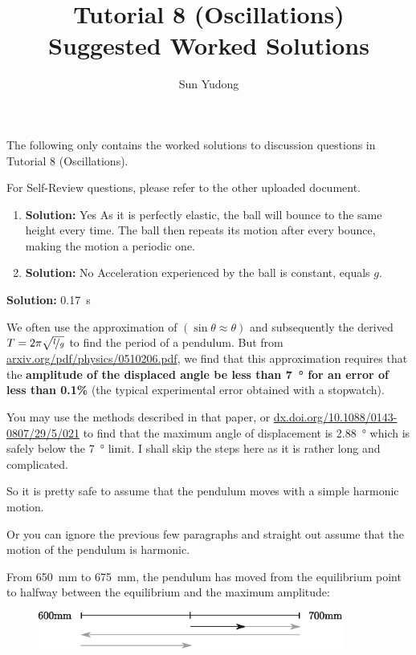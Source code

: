 \documentclass[11pt]{article}
\title{Tutorial 8 (Oscillations)\\Suggested Worked Solutions}
\author{Sun Yudong}
\newcommand{\solution}[1]{\textbf{Solution: } #1 \hspace{5mm}}
\begin{document}
	\maketitle
	The following only contains the worked solutions to discussion questions in Tutorial 8 (Oscillations).
	
	For Self-Review questions, please refer to the other uploaded document.
	
	\begin{enumerate}[label={[D\arabic*]},itemsep={1em}]
		\item 
			\begin{enumerate}[label={(\roman*)}]
				\item \solution{Yes} As it is perfectly elastic, the ball will bounce to the same height every time. The ball then repeats its motion after every bounce, making the motion a periodic one. 
				\item \solution{No}
				Acceleration experienced by the ball is constant, equals $g$.
			\end{enumerate}
		\item \solution{\SI{0.17}{\second}}
			
			We often use the approximation of $\left(\sin\theta \approx \theta\right)$ and subsequently the derived $T = 2\pi\sqrt{\nicefrac{l}{g}}$ to find the period of a pendulum. But from \url{arxiv.org/pdf/physics/0510206.pdf}, we find that this approximation requires that the \textbf{amplitude of the displaced angle be less than \SI{7}{\degree} for an error of less than 0.1\%} (the typical experimental error obtained with a stopwatch). 
			
			You may use the methods described in that paper, or \url{dx.doi.org/10.1088/0143-0807/29/5/021} to find that the maximum angle of displacement is \SI{2.88}{\degree} which is safely below the \SI{7}{\degree} limit. I shall skip the steps here as it is rather long and complicated. 
			
			So it is pretty safe to assume that the pendulum moves with a simple harmonic motion.
			
			Or you can ignore the previous few paragraphs and straight out assume that the motion of the pendulum is harmonic. 
			
			From \SI{650}{\milli\meter} to \SI{675}{\milli\meter}, the pendulum has moved from the equilibrium point to halfway between the equilibrium and the maximum amplitude:
			
			\begin{figure}[ht!]
				\centering
				\includegraphics[width=10cm]{D2.eps}
				\vspace{-0.7em}
			\end{figure}
			

\end{enumerate}
\end{document}
